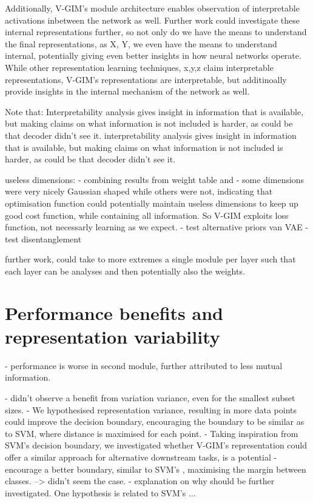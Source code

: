 	Additionally, V-GIM's module architecture enables observation of interpretable activations inbetween the network as well. Further work could investigate these internal representations further, so not only do we have the means to understand the final representations, as X, Y, we even have the means to understand internal, potentially giving even better insights in how neural networks operate. While other representation learning techniques, x,y,z claim interpretable representations, V-GIM's representations are interpretable, but additinoally provide insights in the internal mechanism of the network as well.
	
	Note that:
		Interpretability analysis gives insight in information that is available, but making claims on what information is not included is harder, as could be that decoder didn't see it. interpretability analysis gives insight in information that is available, but making claims on what information is not included is harder, as could be that decoder didn't see it. 
		
	useless dimensions:
		- combining results from weight table and 
	 	- some dimensions were very nicely Gaussian shaped while others were not, indicating that optimisation function could potentially maintain useless dimensions to keep up good cost function, while containing all information. So V-GIM exploits loss function, not necessarly learning as we expect.
	 	- test alternative priors van VAE
		 - test disentanglement
		


	further work, could take to more extremes a single module per layer such that each layer can be analyses and then potentially also the weights.


		
\section{Performance benefits and representation variability}
		- performance is worse in second module, further attributed to less mutual information.

		- didn't observe a benefit from variation variance, even for the smallest subset sizes.
		- We hypothesised representation variance, resulting in more data points could improve the decision boundary, encouraging the boundary to be similar as to SVM, where distance is maximised for each point.
		- Taking inspiration from SVM's decision boundary, we investigated whether V-GIM's representation could offer a similar approach for alternative downstream tasks, is a potential 
			- encourage a better boundary, similar to SVM's \citep{hearstSupportVectorMachines1998, nobleWhatSupportVector2006}, maximising the margin between classes.
			 --> didn't seem the case.
		- explanation on why should be further investigated. One hypothesis is related to SVM's ...
		
